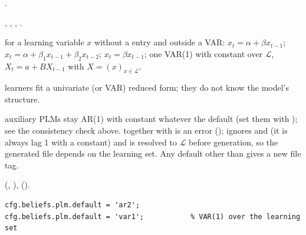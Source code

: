 \documentclass[11pt,a4paper]{article}
\DeclareRobustCommand{\codem}[1]{\texttt{\detokenize{#1}}}
\newenvironment{optspec}%
  {\begin{description}[style=sameline,leftmargin=2.7cm,labelwidth=2.5cm,font=\normalfont\itshape]}%
  {\end{description}}
\begin{document}
\subsubsection{\texorpdfstring{\codem{beliefs.plm.default}}{beliefs.plm.default}}\label{opt:beliefs-plm-default}
\begin{optspec}
  \item[Default] .
  \item[Values] , , , .
  \item[Math] for a learning variable $x$ without a  entry and outside a VAR:
         $x_t = \alpha + \beta x_{t-1}$; 
        $x_t = \alpha + \beta_1 x_{t-1} + \beta_2 x_{t-2}$; 
        $x_t = \beta x_{t-1}$;  one VAR(1) with constant over $\mathcal{L}$,
        $X_t = a + B X_{t-1}$ with $X = (x)_{x\in\mathcal{L}}$.
  \item[Assumptions] learners fit a univariate (or VAR) reduced form; they do not know the
        model's structure.
  \item[Interactions] auxiliary PLMs stay AR(1) with constant whatever the default (set them
        with ); see the consistency check above.  together with
         is an error ();
         ignores  and  (it is always lag
        1 with a constant) and is resolved to $\mathcal{L}$ before generation, so the generated
        file depends on the learning set. Any default other than  gives a new file
        tag.
  \item[Code]  (, ),
         ().
  \item[Example]
\begin{lstlisting}
cfg.beliefs.plm.default = 'ar2';
cfg.beliefs.plm.default = 'var1';           % VAR(1) over the learning set
\end{lstlisting}
\end{optspec}
\end{document}
